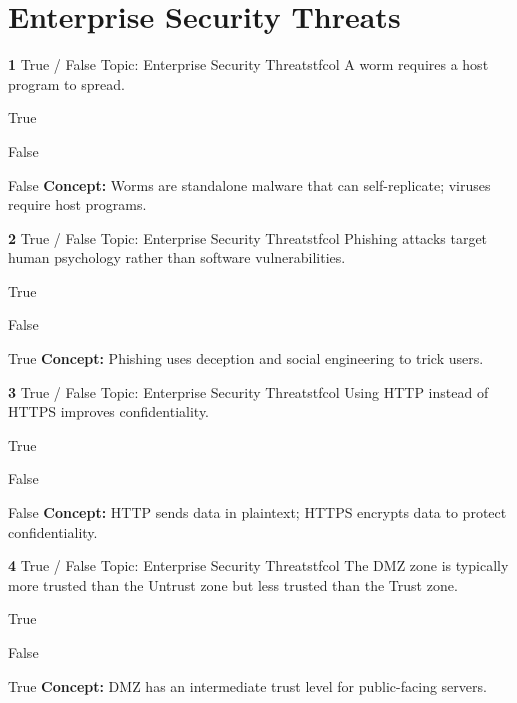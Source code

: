 \documentclass[10pt,a4paper]{article}
\begin{document}
\section{Enterprise Security Threats}
\begin{qcard}{\color{white}\textbf{1} \hfill \small True / False \textbar{} Topic: Enterprise Security Threats}{tfcol}
A worm requires a host program to spread.

\begin{qoptions}
\item True
\item False
\end{qoptions}
\begin{explainbox}{False}
\textbf{Concept:} Worms are standalone malware that can self-replicate; viruses require host programs.
\end{explainbox}
\end{qcard}

\begin{qcard}{\color{white}\textbf{2} \hfill \small True / False \textbar{} Topic: Enterprise Security Threats}{tfcol}
Phishing attacks target human psychology rather than software vulnerabilities.

\begin{qoptions}
\item True
\item False
\end{qoptions}
\begin{explainbox}{True}
\textbf{Concept:} Phishing uses deception and social engineering to trick users.
\end{explainbox}
\end{qcard}

\begin{qcard}{\color{white}\textbf{3} \hfill \small True / False \textbar{} Topic: Enterprise Security Threats}{tfcol}
Using HTTP instead of HTTPS improves confidentiality.

\begin{qoptions}
\item True
\item False
\end{qoptions}
\begin{explainbox}{False}
\textbf{Concept:} HTTP sends data in plaintext; HTTPS encrypts data to protect confidentiality.
\end{explainbox}
\end{qcard}

\begin{qcard}{\color{white}\textbf{4} \hfill \small True / False \textbar{} Topic: Enterprise Security Threats}{tfcol}
The DMZ zone is typically more trusted than the Untrust zone but less trusted than the Trust zone.

\begin{qoptions}
\item True
\item False
\end{qoptions}
\begin{explainbox}{True}
\textbf{Concept:} DMZ has an intermediate trust level for public-facing servers.
\end{explainbox}
\end{qcard}
\end{document}
